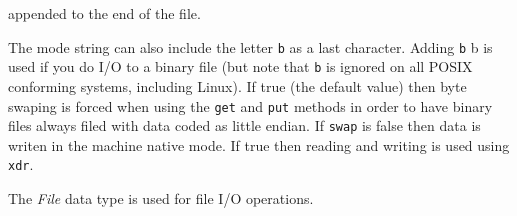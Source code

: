 \begin{parameters}
\begin{varlist}
\begin{description}
        appended to the end of the file.
    \end{description}
    The mode string can also include the letter \verb+b+ as a last character. 
    Adding \verb+b+ b is used if you do I/O to a binary file 
    (but note that \verb+b+ is ignored on all POSIX conforming systems, including Linux).
     If true (the default value) then byte swaping is forced when using the \verb+get+ and 
    \verb+put+ methods in order to have binary files always filed with data coded as little endian. 
    If \verb+swap+ is false then data is writen in the machine native mode. 
     If true then reading and writing is used using \verb+xdr+.
  \end{varlist}
\end{parameters}

\begin{mandescription}
The \emph{File} data type is used for file I/O operations.
\end{mandescription}

